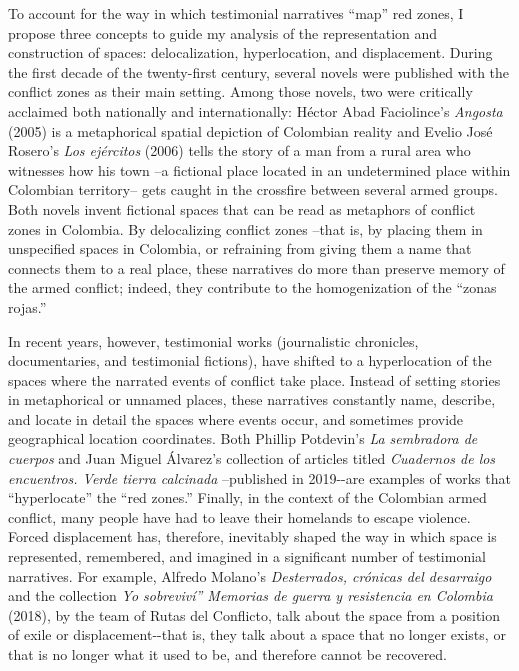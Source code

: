 \documentclass[
  11pt,
,
onecolumn,
openany
]{book}
\begin{document}
To account for the way in which testimonial narratives ``map'' red zones, I
propose three concepts to guide my analysis of the representation and
construction of spaces: delocalization, hyperlocation, and displacement.
During the first decade of the twenty-first century, several novels were
published with the conflict zones as their main setting. Among those novels,
two were critically acclaimed both nationally and internationally: Héctor Abad
Faciolince's \emph{Angosta} (2005) is a metaphorical spatial depiction of
Colombian reality and Evelio José Rosero's \emph{Los ejércitos} (2006) tells
the story of a man from a rural area who witnesses how his town --a fictional
place located in an undetermined place within Colombian territory-- gets
caught in the crossfire between several armed groups. Both novels invent
fictional spaces that can be read as metaphors of conflict zones in Colombia.
By delocalizing conflict zones --that is, by placing them in unspecified
spaces in Colombia, or refraining from giving them a name that connects them
to a real place, these narratives do more than preserve memory of the armed
conflict; indeed, they contribute to the homogenization of the ``zonas
rojas.''

In recent years, however, testimonial works (journalistic chronicles,
documentaries, and testimonial fictions), have shifted to a hyperlocation of
the spaces where the narrated events of conflict take place. Instead of
setting stories in metaphorical or unnamed places, these narratives constantly
name, describe, and locate in detail the spaces where events occur, and
sometimes provide geographical location coordinates. Both Phillip Potdevin's
\emph{La sembradora de cuerpos} and Juan Miguel Álvarez's collection of
articles titled \emph{Cuadernos de los encuentros. Verde tierra calcinada}
--published in 2019-\/-are examples of works that ``hyperlocate'' the ``red
zones.'' Finally, in the context of the Colombian armed conflict, many people
have had to leave their homelands to escape violence. Forced displacement has,
therefore, inevitably shaped the way in which space is represented,
remembered, and imagined in a significant number of testimonial narratives.
For example, Alfredo Molano's \emph{Desterrados, crónicas del desarraigo} and
the collection \emph{Yo sobreviví'' Memorias de guerra y resistencia en
Colombia} (2018), by the team of Rutas del Conflicto, talk about the space
from a position of exile or displacement-\/-that is, they talk about a space
that no longer exists, or that is no longer what it used to be, and therefore
cannot be recovered.
\end{document}

